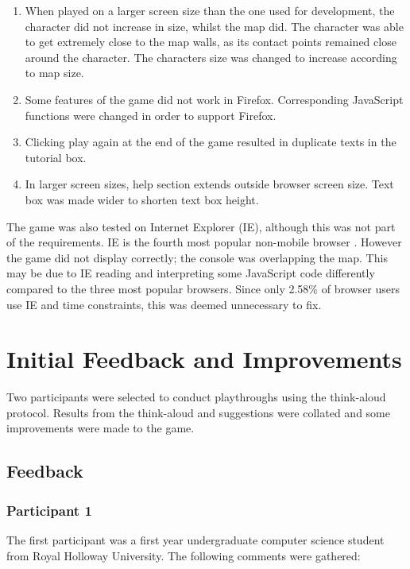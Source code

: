 \documentclass[a4paper,11.5pt]{report}
\numberwithin{figure}{section}
\numberwithin{table}{section}
\numberwithin{equation}{section}
\numberwithin{equation}{section}
\begin{document}
\begin{enumerate}
	\item When played on a larger screen size than the one used for development, the character did not increase in size, whilst the map did. The character was able to get extremely close to the map walls, as its contact points remained close around the character. The characters size was changed to increase according to map size.
	\item Some features of the game did not work in Firefox. Corresponding JavaScript functions were changed in order to support Firefox.
	\item Clicking play again at the end of the game resulted in duplicate texts in the tutorial box. 
	\item In larger screen sizes, help section extends outside browser screen size. Text box was made wider to shorten text box height.
\end{enumerate}

The game was also tested on Internet Explorer (IE), although this was not part of the requirements. IE is the fourth most popular non-mobile browser \citep{statistabrowser}. However the game did not display correctly; the console was overlapping the map. This may be due to IE reading and interpreting some JavaScript code differently compared to the three most popular browsers. Since only 2.58\% of browser users use IE and time constraints, this was deemed unnecessary to fix.

\section{Initial Feedback and Improvements}

Two participants were selected to conduct playthroughs using the think-aloud protocol. Results from the think-aloud and suggestions were collated and some improvements were made to the game.

\subsection{Feedback}

\subsubsection*{Participant 1}

The first participant was a first year undergraduate computer science student from Royal Holloway University. The following comments were gathered: 
\end{document}
